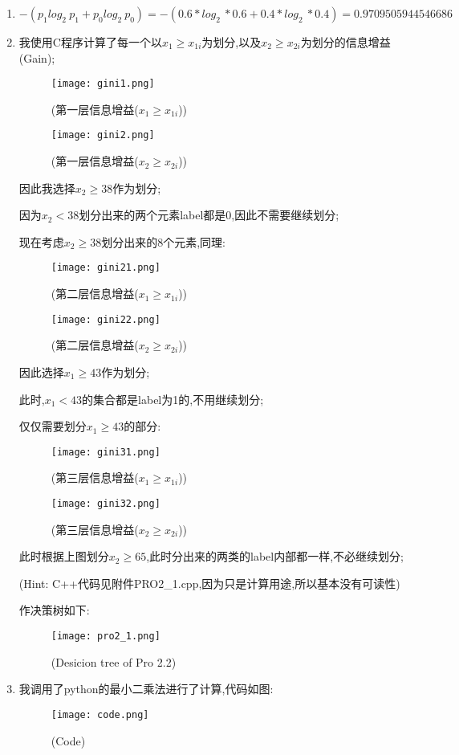 \documentclass[11pt, a4paper, UTF8]{ctexart}
\begin{document}
\begin{solution}
\begin{enumerate}
	\item $-(p_1log_2~p_1+p_0log_2~p_0)=-(0.6*log_2~*0.6+0.4*log_2~*0.4)=0.9709505944546686$
	\item 我使用C程序计算了每一个以$x_1\geq x_{1i}$为划分,以及$x_2\geq x_{2i}$为划分的信息增益(Gain);
			 \begin{figure}[htbp] 
		\centering
		\texttt{[image: gini1.png]}
		\caption{(第一层信息增益($x_1\geq x_{1i}$))}
	\end{figure} 
	 \begin{figure}[htbp] 
	\centering
	\texttt{[image: gini2.png]}
	\caption{(第一层信息增益($x_2\geq x_{2i}$))}
\end{figure}
因此我选择$x_2\geq 38$作为划分;


因为$x_2<38$划分出来的两个元素label都是0,因此不需要继续划分;

现在考虑$x_2\geq 38$划分出来的8个元素,同理:
			 \begin{figure}[htbp] 
	\centering
	\texttt{[image: gini21.png]}
	\caption{(第二层信息增益($x_1\geq x_{1i}$))}
\end{figure} 
\begin{figure}[htbp] 
	\centering
	\texttt{[image: gini22.png]}
	\caption{(第二层信息增益($x_2\geq x_{2i}$))}
\end{figure}

因此选择$x_1\geq 43$作为划分;

此时,$x_1<43$的集合都是label为1的,不用继续划分;

仅仅需要划分$x_1\geq 43$的部分:
	 \begin{figure}[htbp] 
	\centering
	\texttt{[image: gini31.png]}
	\caption{(第三层信息增益($x_1\geq x_{1i}$))}
\end{figure} 
\begin{figure}[htbp] 
	\centering
	\texttt{[image: gini32.png]}
	\caption{(第三层信息增益($x_2\geq x_{2i}$))}
\end{figure}
此时根据上图划分$x_2\geq 65$,此时分出来的两类的label内部都一样,不必继续划分;

(Hint: C++代码见附件PRO2\_1.cpp,因为只是计算用途,所以基本没有可读性)

作决策树如下:

		 \begin{figure}[htbp] 
	\centering
	\texttt{[image: pro2\_1.png]}
	\caption{(Desicion tree of Pro 2.2)}
\end{figure} 
\item 我调用了python的最小二乘法进行了计算,代码如图:
		 \begin{figure}[htbp] 
	\centering
	\texttt{[image: code.png]}
	\caption{(Code)}
\end{figure} 


\end{enumerate}
\end{solution}
\end{document}

